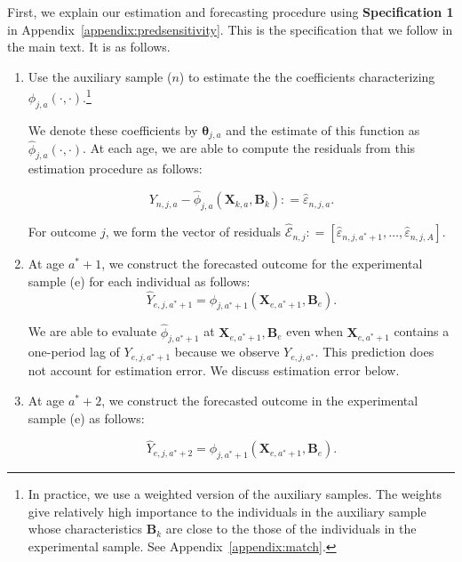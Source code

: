 \noindent First, we explain our estimation and forecasting procedure using \textbf{Specification 1} in Appendix~\ref{appendix:predsensitivity}. This is the specification that we follow in the main text. It is as follows.

\begin{enumerate}
\item Use the auxiliary sample ($n$) to estimate the the coefficients characterizing $\phi_{j,a} \left( \cdot , \cdot \right)$.\footnote{In practice, we use a weighted version of the auxiliary samples. The weights give relatively high importance to the individuals in the auxiliary sample whose characteristics $\bm{B}_k$ are close to the those of the individuals in the experimental sample. See Appendix~\ref{appendix:match}.}

We denote these coefficients by $\bm{\theta}_{j,a}$ and the estimate of this function as $\hat{\phi}_{j,a} \left( \cdot , \cdot \right)$. At each age, we are able to compute the residuals from this estimation procedure as follows:

\begin{equation}
Y_{n,j,a} -  \hat{\phi}_{j,a} (\bm{X}_{k,a}, \bm{B}_k) : = \hat{\varepsilon}_{n,j,a}.
\end{equation}

For outcome $j$, we form the vector of residuals $\hat{\mathcal{E}}_{n,j} : = \left[ \hat{\varepsilon}_{n,j,a^*+1}, \ldots, \hat{\varepsilon}_{n,j,A} \right]$.

\item At age $a^*+1$, we construct the forecasted outcome for the experimental sample (e) for each individual as follows:
\begin{equation}
\hat{Y}_{e,j,a^*+1} = \hat{\phi}_{j,a^*+1} \left( \bm{X}_{e,a^*+1}, \bm{B}_e \right).
\end{equation}

\noindent We are able to evaluate $\hat{\phi}_{j,a^*+1}$ at $ \bm{X}_{e,a^*+1}, \bm{B}_e $ even when $\bm{X}_{e,a^*+1}$ contains a one-period lag of $Y_{e,j,a^*+1}$ because we observe $Y_{e,j,a^*}$. This prediction does not account for estimation error. We discuss estimation error below.

\item At age $a^*+2$, we construct the forecasted outcome in the experimental sample (e) as follows:

\begin{equation}
\hat{Y}_{e,j,a^*+2} = \hat{\phi}_{j,a^*+1} \left( \bm{X}_{e,a^*+1}, \bm{B}_e \right).
\end{equation}


\end{enumerate}
